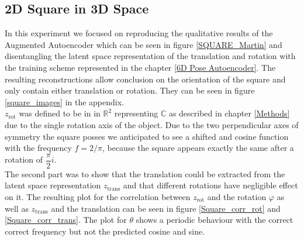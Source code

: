 \documentclass[10pt,a4paper]{article}
\newcommand{\rot}{\ensuremath{\text{rot}\xspace}}
\newcommand{\trans}{\ensuremath{\text{trans}\xspace}}
\begin{document}
\subsection{2D Square in 3D Space}\label{Square}
In this experiment we focused on reproducing the qualitative results of the Augmented Autoencoder which can be seen in figure \ref{SQUARE_Martin} and disentangling the latent space representation of the translation and rotation with the training scheme represented in the chapter \ref{6D Pose Autoencoder}. The resulting reconstructions allow conclusion on the orientation of the square and only contain either translation or rotation. They can be seen in figure \ref{square_images} in the appendix.\\
$z_{\rot}$ was defined to be in in $\mathbb{R}^2$ representing $\mathbb{C}$ as described in chapter \ref{Methods} due to the single rotation axis of the object. Due to the two perpendicular axes of symmetry the square posses we anticipated to see a shifted and cosine function with the frequency $f = 2/ \pi$, because the square appears exactly the same after a rotation of $\dfrac{\pi}{2}i$. \\
The second part was to show that the translation could be extracted from the latent space representation $z_{\trans}$ and that different rotations have negligible effect on it. The resulting plot for the correlation between $z_{\rot}$ and the rotation $\varphi$ as well as $z_{\trans}$ and the translation can be seen in figure \ref{Square_corr_rot} and \ref{Square_corr_trans}. 
The plot for $\theta$ shows a periodic behaviour with the correct correct frequency but not the predicted cosine and sine.
\end{document}

